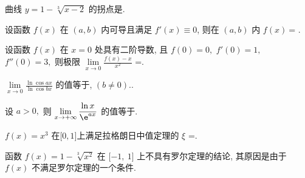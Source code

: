 
\begin{problem} 曲线 $y = 1 - \sqrt[3]{x - 2}$ 的拐点是.

\end{problem}

\begin{problem} 设函数 $f(x)$ 在 $(a,b)$ 内可导且满足
$f'\left( x \right) \equiv 0$, 则在 $(a,b)$ 内 $f(x)\ $=
.

\end{problem}

\begin{problem} 设函数 $f(x)$ 在 $x = 0$ 处具有二阶导数, 且 $f(0) = 0,$
$f'\left( 0 \right) = 1,$ $f''\left( 0 \right) = 3,$ 则极限
$\displaystyle \lim\limits_{x \rightarrow 0}\frac{f\left( x \right) - x}{x^{2}}$ =.

\end{problem}

\begin{problem} $\displaystyle \lim\limits_{x \rightarrow 0}\frac{\ln{\cos a}x}{\ln{\cos b}x}$
的值等于, $\left( b \neq 0 \right).$.



\end{problem}


\begin{problem} 设 $a > 0,$ 则
$\lim\limits_{x \rightarrow + \infty}\displaystyle \frac{\ln x}{\e^{{ax}}}$
的值等于.

\end{problem}

\begin{problem} $f\left( x \right) = x^{3}$
在$\lbrack 0,1\rbrack$上满足拉格朗日中值定理的 $\xi$
=.

\end{problem}

\begin{problem} 函数 $f\left( x \right) = 1 - \sqrt[3]{x^{2}}$ 在
$\lbrack - 1,\ 1\rbrack$ 上不具有罗尔定理的结论, 其原因是由于 $f(x)$
不满足罗尔定理的一个条件.

\end{problem}


